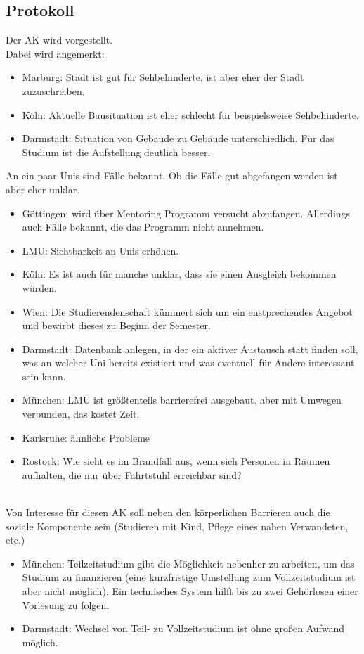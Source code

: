   \subsection*{Protokoll}
    Der AK wird vorgestellt. \\
    Dabei wird angemerkt:
    \begin{itemize}
      \item Marburg: Stadt ist gut für Sehbehinderte, ist aber eher der Stadt zuzuschreiben.
      \item Köln: Aktuelle Bausituation ist eher schlecht für beispielsweise Sehbehinderte.
      \item Darmstadt: Situation von Gebäude zu Gebäude unterschiedlich. Für das Studium ist die Aufstellung deutlich besser.
    \end{itemize}

    An ein paar Unis sind Fälle bekannt. Ob die Fälle gut abgefangen werden ist aber eher unklar.
    \begin{itemize}
      \item Göttingen: wird über Mentoring Programm versucht abzufangen. Allerdings auch Fälle bekannt, die das Programm nicht annehmen.
      \item LMU: Sichtbarkeit an Unis erhöhen.
      \item Köln: Es ist auch für manche unklar, dass sie einen Ausgleich bekommen würden.
      \item Wien: Die Studierendenschaft kümmert sich um ein enstprechendes Angebot und bewirbt dieses zu Beginn der Semester.
      \item Darmstadt: Datenbank anlegen, in der ein aktiver Austausch statt finden soll, was an welcher Uni bereits existiert und was eventuell für Andere interessant sein kann.
      \item München: LMU ist größtenteils barrierefrei ausgebaut, aber mit Umwegen verbunden, das kostet Zeit.
      \item Karlsruhe: ähnliche Probleme
      \item Rostock: Wie sieht es im Brandfall aus, wenn sich Personen in Räumen aufhalten, die nur über Fahrtstuhl erreichbar sind?
    \end{itemize} \\

    Von Interesse für diesen AK soll neben den körperlichen Barrieren auch die soziale Komponente sein (Studieren mit Kind, Pflege eines nahen Verwandeten, etc.)
    \begin{itemize}
      \item München: Teilzeitstudium gibt die Möglichkeit nebenher zu arbeiten, um das Studium zu finanzieren (eine kurzfristige Umstellung zum Vollzeitstudium ist aber nicht möglich). Ein technisches System hilft bis zu zwei Gehörlosen einer Vorlesung zu folgen.
      \item Darmstadt: Wechsel von Teil- zu Vollzeitstudium ist ohne großen Aufwand möglich.
    \end{itemize}

